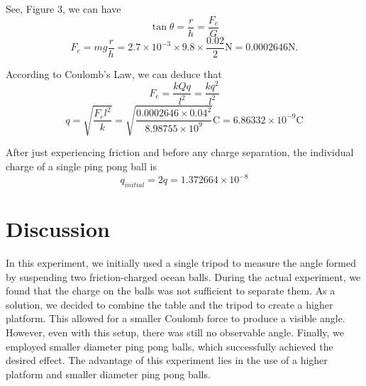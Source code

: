 \documentclass[12pt]{article}
\begin{document}
See, Figure 3, we can have
$$
\tan{\theta} = \frac{r}{h} = \frac{F_e}G 
$$
$$
F_e = mg\frac{r}h = 2.7\times10^{-3} \times 9.8 \times \frac{0.02}{2}\text{N}=0.0002646\text{N}.
$$

According to Coulomb's Law, we can deduce that
$$
F_e = \frac{kQq}{l^2} = \frac{kq^2}{l^2} 
$$
$$
q = \sqrt{\frac{F_el^2}{k}} = \sqrt{\frac{0.0002646\times0.04^2}{8.98755 \times 10^{9}}} \text{C}= 6.86332\times 10^{-9}\text{C}
$$

After just experiencing friction and before any charge separation, the individual charge of a single ping pong ball is
$$
q_{initial} = 2q = 1.372664\times 10^{-8}
$$




\section{Discussion}
\label{sec:con}
In this experiment, we initially used a single tripod to measure the angle formed by suspending two friction-charged ocean balls. During the actual experiment, we found that the charge on the balls was not sufficient to separate them. As a solution, we decided to combine the table and the tripod to create a higher platform. This allowed for a smaller Coulomb force to produce a visible angle. However, even with this setup, there was still no observable angle. Finally, we employed smaller diameter ping pong balls, which successfully achieved the desired effect. The advantage of this experiment lies in the use of a higher platform and smaller diameter ping pong balls.
\end{document}
